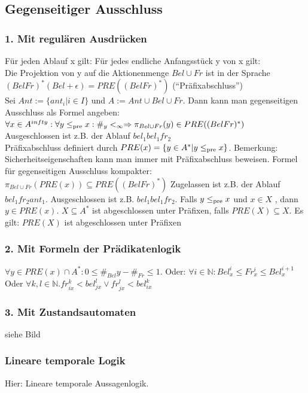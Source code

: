 \subsection*{Gegenseitiger Ausschluss}
\subsubsection*{1. Mit regulären Ausdrücken}
Für jeden Ablauf x gilt: Für jedes endliche Anfangsstück y von x gilt:\\
Die Projektion von y auf die Aktionenmenge $Bel \cup Fr$ ist in der Sprache $(Bel Fr)^*(Bel + \epsilon) = PRE((Bel Fr)^*)$ ("`Präfixabschluss"')\\
Sei $Ant:=\{ant_i | i \in I\}$ und $A:=Ant \cup Bel \cup Fr$. Dann kann man gegenseitigen Ausschluss als Formel angeben: $\forall x \in A^{infty}: \forall y \leq_{\operatorname{pre}} x: \#_y <_\infty \Rightarrow \pi_{Bel \cup Fr}(y) \in PRE((Bel Fr)^*)$\\
Ausgeschlossen ist z.B. der Ablauf $bel_1 bel_1 fr_2$\\
Präfixabschluss definiert durch $PRE(x)= \{y \in A^* | y \leq_{\operatorname{pre}} x \}$.
Bemerkung: Sicherheitseigenschaften kann man immer mit Präfixabschluss beweisen.
Formel für gegenseitigen Ausschluss kompakter: $\pi_{Bel \cup Fr}(PRE(x)) \subseteq PRE((Bel Fr)^*)$
Zugelassen ist z.B. der Ablauf $bel_1 fr_2 ant_1$. Ausgeschlossen ist z.B. $bel_1 bel_1 fr_2$.
Falls $y \leq_{\operatorname{pre}} x$ und $x \in X$ , dann $y \in PRE(x)$.
$X \subseteq A^*$ ist abgeschlossen unter Präfixen, falls $PRE(X) \subseteq X$. Es gilt: $PRE(X)$ ist abgeschlossen unter Präfixen
\subsubsection*{2. Mit Formeln der Prädikatenlogik}
$\forall y \in PRE(x) \cap A^*: 0 \leq \#_{Bel}y - \#_{Fr} \leq 1$.
Oder: $\forall i \in \mathbb{N}: Bel_x^i \leq Fr_x^i \leq Bel_x^{i+1}$
Oder $\forall k,l \in \mathbb{N}. fr_{i x}^k < bel_{j x}^l \lor fr_{j x}^l < bel_{i x}^k$

\subsubsection*{3. Mit Zustandsautomaten}
siehe Bild

\subsubsection*{Lineare temporale Logik}
Hier: Lineare temporale Aussagenlogik.

